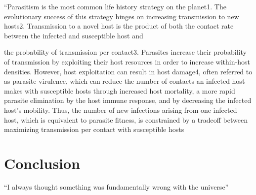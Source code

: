 \documentclass[letterpaper,12pt]{article}%
\begin{document}
“Parasitism is the most common life history strategy on the planet1. The evolutionary success of this strategy hinges on increasing transmission to new hosts2. Transmission to a novel host is the product of both the contact rate between the infected and susceptible host and	 
\begin{minipage}{\linewidth}%
\label{If only}%
\end{minipage}
the probability of transmission per contact3. Parasites increase their probability of transmission by exploiting their host resources in order to increase within-host densities. However, host exploitation can result in host damage4, often referred to as parasite virulence, which can reduce the number of contacts an infected host makes with susceptible hosts through increased host mortality, a more rapid parasite elimination by the host immune response, and by decreasing the infected host’s mobility. Thus, the number of new infections arising from one infected host, which is equivalent to parasite fitness, is constrained by a tradeoff between maximizing transmission per contact with susceptible hosts 




\section{Conclusion}
``I always thought something was fundamentally wrong with the universe'' \citep{adams1995hitchhiker}



\end{document}

